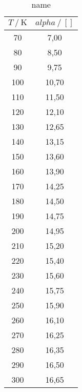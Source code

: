 \begin{table}[H] 
   \centering 
   \caption{name} 
   \label{tab:name} 
   \begin{tabular} { c c } 
 \toprule 
 {$T\:/\: \mathrm{K}$} & {$alpha\:/\: \mathrm{[]}$} \\ 
    \midrule 
    70 & 7,00 \\ 
    80 & 8,50 \\ 
    90 & 9,75 \\ 
    100 & 10,70 \\ 
    110 & 11,50 \\ 
    120 & 12,10 \\ 
    130 & 12,65 \\ 
    140 & 13,15 \\ 
    150 & 13,60 \\ 
    160 & 13,90 \\ 
    170 & 14,25 \\ 
    180 & 14,50 \\ 
    190 & 14,75 \\ 
    200 & 14,95 \\ 
    210 & 15,20 \\ 
    220 & 15,40 \\ 
    230 & 15,60 \\ 
    240 & 15,75 \\ 
    250 & 15,90 \\ 
    260 & 16,10 \\ 
    270 & 16,25 \\ 
    280 & 16,35 \\ 
    290 & 16,50 \\ 
    300 & 16,65 \\ 
    \bottomrule 
  \end{tabular}
\end{table}